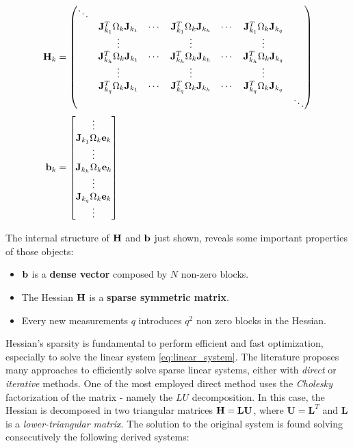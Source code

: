 \begin{align}
    \label{eq:sparse_hessian_structure}
    \mathbf{H}_k &= 
        \begin{pmatrix}
            \ddots &  &  &  &  &  &\\
             & \mathbf{J}_{k_1}^T\Omega_k\mathbf{J}_{k_1} & \cdots & \mathbf{J}_{k_1}^T\Omega_k\mathbf{J}_{k_h} & \cdots & \mathbf{J}_{k_1}^T\Omega_k\mathbf{J}_{k_q} & \\
             & \vdots & & \vdots & & \vdots & \\
             & \mathbf{J}_{k_h}^T\Omega_k\mathbf{J}_{k_1} & \cdots & \mathbf{J}_{k_h}^T\Omega_k\mathbf{J}_{k_h} & \cdots & \mathbf{J}_{k_h}^T\Omega_k\mathbf{J}_{k_q} & \\
             & \vdots & & \vdots & & \vdots & \\
             & \mathbf{J}_{k_q}^T\Omega_k\mathbf{J}_{k_1} & \cdots & \mathbf{J}_{k_q}^T\Omega_k\mathbf{J}_{k_h} & \cdots & \mathbf{J}_{k_q}^T\Omega_k\mathbf{J}_{k_q} & \\
             &  &  &  &  &  & \ddots \\
        \end{pmatrix} \\
    \mathbf{b}_k &= 
        \begin{bmatrix}
            \vdots \\
            \mathbf{J}_{k_1}\Omega_k\mathbf{e}_k \\
            \vdots \\
            \mathbf{J}_{k_h}\Omega_k\mathbf{e}_k \\
            \vdots \\
            \mathbf{J}_{k_q}\Omega_k\mathbf{e}_k \\
            \vdots
        \end{bmatrix}
    \label{eq:rhs_structure}
\end{align}

The internal structure of $\mathbf{H}$ and $\mathbf{b}$ just shown, reveals some important properties of those objects:

\begin{itemize}
    \item $\mathbf{b}$ is a \textbf{dense vector} composed by $N$ non-zero blocks. 
    \item The Hessian $\mathbf{H}$ is a \textbf{sparse symmetric matrix}.
    \item Every new measurements $q$ introduces $q^2$ non zero blocks in the Hessian.
\end{itemize}

Hessian's sparsity is fundamental to perform efficient and fast optimization, especially to solve the linear system \ref{eq:linear_system}. The literature proposes many approaches to efficiently solve sparse linear systems, either with \textit{direct} \cite{davis2006directSPsolvers} or \textit{iterative} \cite{saad2003iterativeSPsolvers} methods. One of the most employed direct method uses the \textit{Cholesky} factorization of the matrix - namely the $LU$ decomposition. In this case, the Hessian is decomposed in two triangular matrices $\mathbf{H} = \mathbf{L}\mathbf{U}$, where $\mathbf{U} = \mathbf{L}^T$ and $\mathbf{L}$ is a \textit{lower-triangular matrix}. The solution to the original system is found solving consecutively the following derived systems:

